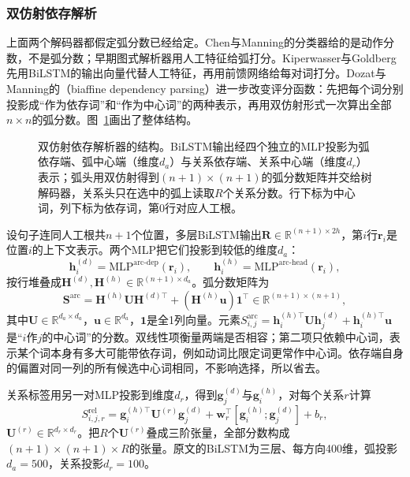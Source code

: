 \subsubsection{双仿射依存解析}
\label{sec:nlp-analysis-biaffine}

上面两个解码器都假定弧分数已经给定。Chen与Manning的分类器给的是动作分数，不是弧分数；早期图式解析器用人工特征给弧打分。Kiperwasser与Goldberg先用BiLSTM的输出向量代替人工特征，再用前馈网络给每对词打分。Dozat与Manning的（biaffine dependency parsing）进一步改变评分函数：先把每个词分别投影成“作为依存词”和“作为中心词”的两种表示，再用双仿射形式一次算出全部$n\times n$的弧分数。图~\ref{fig:nlp-analysis-biaffine}画出了整体结构。

\begin{figure}[htbp]
  \centering
  
  \caption{双仿射依存解析器的结构。BiLSTM输出经四个独立的MLP投影为弧依存端、弧中心端（维度$d_a$）与关系依存端、关系中心端（维度$d_r$）表示；弧头用双仿射得到$(n+1)\times(n+1)$的弧分数矩阵并交给树解码器，关系头只在选中的弧上读取$R$个关系分数。行下标为中心词，列下标为依存词，第0行对应人工根。}
  \label{fig:nlp-analysis-biaffine}
\end{figure}

设句子连同人工根共$n+1$个位置，多层BiLSTM输出$\bm R\in\mathbb R^{(n+1)\times2h}$，第$i$行$\bm r_i$是位置$i$的上下文表示。两个MLP把它们投影到较低的维度$d_a$：
\[
 \bm h^{(d)}_i=\mathrm{MLP}^{\mathrm{arc\mbox{-}dep}}(\bm r_i),\qquad
 \bm h^{(h)}_i=\mathrm{MLP}^{\mathrm{arc\mbox{-}head}}(\bm r_i),
\]
按行堆叠成$\bm H^{(d)},\bm H^{(h)}\in\mathbb R^{(n+1)\times d_a}$。弧分数矩阵为
\begin{equation}
 \bm S^{\mathrm{arc}}=\bm H^{(h)}\bm U\bm H^{(d)\top}+(\bm H^{(h)}\bm u)\bm 1^{\top}\in\mathbb R^{(n+1)\times(n+1)},
 \label{eq:nlp-analysis-biaffine}
\end{equation}
其中$\bm U\in\mathbb R^{d_a\times d_a}$，$\bm u\in\mathbb R^{d_a}$，$\bm 1$是全1列向量。元素$S^{\mathrm{arc}}_{i,j}=\bm h^{(h)\top}_i\bm U\bm h^{(d)}_j+\bm h^{(h)\top}_i\bm u$是“$i$作$j$的中心词”的分数。双线性项衡量两端是否相容；第二项只依赖中心词，表示某个词本身有多大可能带依存词，例如动词比限定词更常作中心词。依存端自身的偏置对同一列的所有候选中心词相同，不影响选择，所以省去。

关系标签用另一对MLP投影到维度$d_r$，得到$\bm g^{(d)}_j$与$\bm g^{(h)}_i$，对每个关系$r$计算
\[
 S^{\mathrm{rel}}_{i,j,r}=\bm g^{(h)\top}_i\bm U^{(r)}\bm g^{(d)}_j+\bm w_r^{\top}[\bm g^{(h)}_i;\bm g^{(d)}_j]+b_r,
\]
$\bm U^{(r)}\in\mathbb R^{d_r\times d_r}$。把$R$个$\bm U^{(r)}$叠成三阶张量，全部分数构成$(n+1)\times(n+1)\times R$的张量。原文的BiLSTM为三层、每方向400维，弧投影$d_a=500$，关系投影$d_r=100$。

